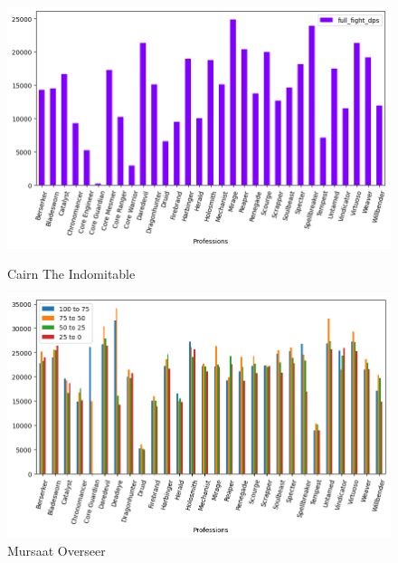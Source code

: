 \documentclass[12pt,a4paper]{article}
\begin{document}
    \begin{figure}[h!]
        
        \centering
        
        \includegraphics[width=1 \linewidth]{cairn_dps_plot.png}
        \caption{Cairn The Indomitable}
        \includegraphics[width=1 \linewidth]{mo_dps_plot.png}
        \caption{Mursaat Overseer}
    \end{figure}

    \newpage
\end{document}
